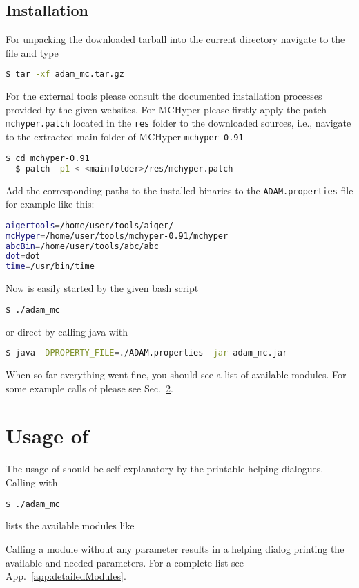 \documentclass[12pt,twoside,a4paper,openright]{memoir}
\begin{document}
\section{Installation}
For unpacking the downloaded tarball into the current directory
navigate to the file and type
\begin{lstlisting}[language=bash]
  $ tar -xf adam_mc.tar.gz
\end{lstlisting}
For the external tools please consult the documented installation processes
provided by the given websites. For MCHyper please firstly apply the patch \texttt{mchyper.patch}
located in the \texttt{res} folder to the downloaded sources, i.e., navigate 
to the extracted main folder of MCHyper \texttt{mchyper-0.91}
\begin{lstlisting}[language=bash]
  $ cd mchyper-0.91
  $ patch -p1 < <mainfolder>/res/mchyper.patch 
\end{lstlisting}
Add the corresponding paths to the installed binaries to the \texttt{ADAM.properties} file
for example like this:
\begin{lstlisting}[language=bash]
aigertools=/home/user/tools/aiger/
mcHyper=/home/user/tools/mchyper-0.91/mchyper
abcBin=/home/user/tools/abc/abc
dot=dot
time=/usr/bin/time
\end{lstlisting}
Now \tool{} is easily started by the given bash script
\begin{lstlisting}[language=bash]
$ ./adam_mc
\end{lstlisting}
or direct by calling java with
\begin{lstlisting}[language=bash]
$ java -DPROPERTY_FILE=./ADAM.properties -jar adam_mc.jar
\end{lstlisting}
When so far everything went fine, you should see a list of available modules.
For some example calls of \tool{} please see Sec.~\ref{sec:usage}.


\chapter{Usage of \tool}
\label{sec:usage}
The usage of \tool{} should be self-explanatory by the printable helping dialogues.
Calling \tool{} with
\begin{lstlisting}[language=bash]
  $ ./adam_mc
\end{lstlisting}
lists the available modules like

Calling a module without any parameter results in a helping dialog printing 
the available and needed parameters. For a complete list see App.~\ref{app:detailedModules}.
\end{document}
